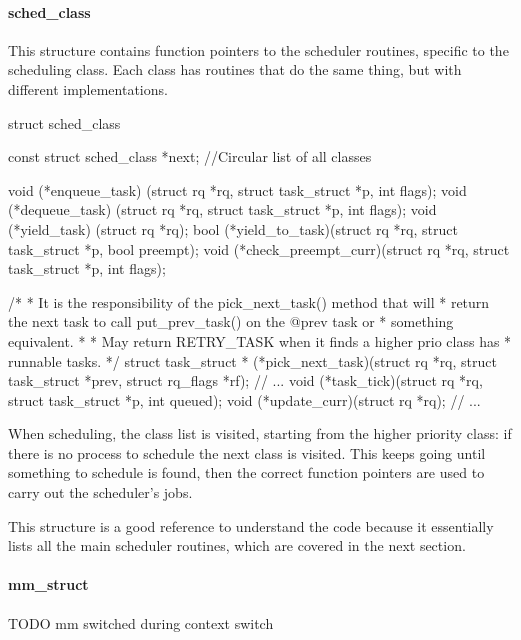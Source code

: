 \paragraph{sched\_class}
This structure contains function pointers to the scheduler routines, specific to the scheduling class. Each class has routines that do the same thing, but with different implementations.

\begin{code}
struct sched_class {
	const struct sched_class *next; //Circular list of all classes

	void (*enqueue_task) (struct rq *rq, struct task_struct *p, int flags);
	void (*dequeue_task) (struct rq *rq, struct task_struct *p, int flags);
	void (*yield_task)   (struct rq *rq);
	bool (*yield_to_task)(struct rq *rq, struct task_struct *p, bool preempt);
	void (*check_preempt_curr)(struct rq *rq, struct task_struct *p, int flags);

	/*
	 * It is the responsibility of the pick_next_task() method that will
	 * return the next task to call put_prev_task() on the @prev task or
	 * something equivalent.
	 *
	 * May return RETRY_TASK when it finds a higher prio class has 
	 * runnable tasks.
	 */
	struct task_struct * (*pick_next_task)(struct rq *rq,
					       struct task_struct *prev,
					       struct rq_flags *rf);
    // ...
    void (*task_tick)(struct rq *rq, struct task_struct *p, int queued);
    void (*update_curr)(struct rq *rq);
    // ...
}
\end{code}
When scheduling, the class list is visited, starting from the higher priority class: if there is no process to schedule the next class is visited. This keeps going until something to schedule is found, then the correct function pointers are used to carry out the scheduler's jobs. 

This structure is a good reference to understand the code because it essentially lists all the main scheduler routines, which are covered in the next section.

\paragraph{mm\_struct} %
TODO mm switched during context switch

